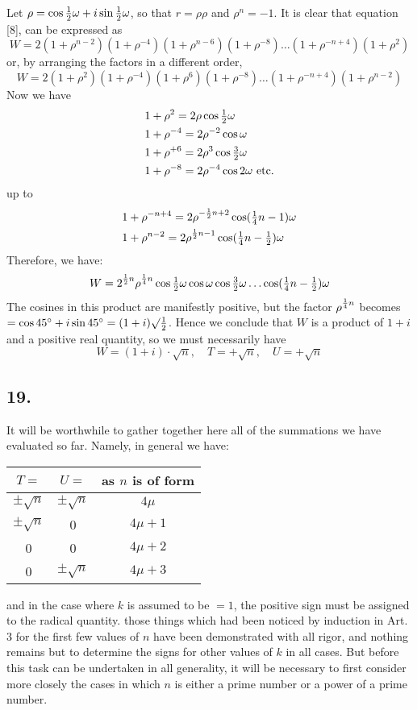 \documentclass[twoside,12pt]{memoir}
\let\oldfrac\frac
\def\frac#1#2{\mathchoice{\tfrac{#1}{#2}}{\oldfrac{#1}{#2}}{\genfrac{}{}{}{2}{#1}{#2\mathstrut}}{\genfrac{}{}{}{3}{#1}{#2\mathstrut}}}
\begin{document}
Let \(\rho=\cos \frac{1}{2} \omega+i \sin \frac{1}{2} \omega\), so that \(r=\rho \rho\) and \(\rho^{n}=-1\).  It is clear that equation [8], can be expressed as
\[W=2(1+\rho^{n-2})(1+\rho^{-4})(1+\rho^{n-6})(1+\rho^{-8}) \ldots(1+\rho^{-n+4})(1+\rho^{2})\]
or, by arranging the factors in a different order,
\[W=2(1+\rho^{2})(1+\rho^{-4})(1+\rho^{6})(1+\rho^{-8}) \ldots(1+\rho^{-n+4})(1+\rho^{n-2})\]
Now we have
\[\begin{aligned}
& 1+\rho^{2}=2 \rho \cos \frac{1}{2} \omega \\
& 1+\rho^{-4}=2 \rho^{-2} \cos \omega \\
& 1+\rho^{+6}=2 \rho^{3} \cos \frac{3}{2} \omega \\
& 1+\rho^{-8}=2 \rho^{-4} \cos 2 \omega \text{ etc{.}}
\end{aligned}\]
up to
\[\begin{aligned}
& 1+\rho^{-n+4}=2 \rho^{-\frac{1}{2} n+2} \cos (\frac{1}{4} n-1) \omega \\
& 1+\rho^{n-2}=2 \rho^{\frac{1}{2} n-1} \cos (\frac{1}{4} n-\frac{1}{2}) \omega
\end{aligned}\]
Therefore, we have:
\[W=2^{\frac{1}{2} n} \rho^{\frac{1}{4} n} \cos \frac{1}{2} \omega \cos \omega \cos \frac{3}{2} \omega \ldots \cos (\frac{1}{4} n-\frac{1}{2}) \omega\]
The cosines in this product are manifestly positive, but the factor \(\rho^{\frac{1}{4}n}\) becomes \(=\cos 45^{\circ}+i \sin 45^{\circ}=(1+i) \surd \frac{1}{2}\). Hence we conclude that \(W\) is a product of \(1+i\) and a positive real quantity, so we must necessarily have
\[W=(1+i) \cdot \surd n, \quad T=+\surd n, \quad U=+\surd n\]
%

\subsection*{19.}

It will be worthwhile to gather together here all of the summations we have evaluated so far. Namely, in general we have:
\begin{center}
\begin{tabular}{|c|c|c|}
\hline
\(T=\) & \(U=\) & as \(n\) is of form \\
\hline
\(\pm \surd n\) & \(\pm \surd n\) & \(4 \mu\) \\
\(\pm \surd n\) & 0 & \(4 \mu+1\) \\
0 & 0 & \(4 \mu+2\) \\
0 & \(\pm \surd n\) & \(4 \mu+3\) \\
\hline
\end{tabular}
\end{center}
and in the case where \(k\) is assumed to be \(=1\), the positive sign must be assigned to the radical quantity. those things which had been noticed by induction in Art. 3 for the first few values of \(n\) have been demonstrated with all rigor, and nothing remains but to determine the signs for other values of \(k\) in all cases. But before this task can be undertaken in all generality, it will be necessary to first consider more closely the cases in which \(n\) is either a prime number or a power of a prime number.
%
\end{document}
